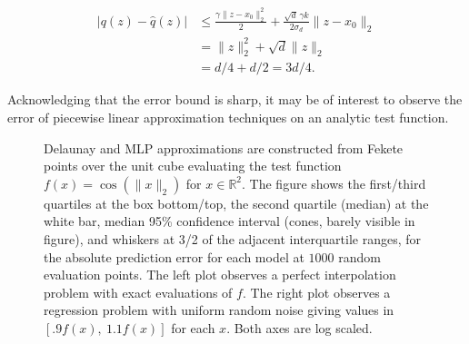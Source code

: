 \vspace{-2mm}
\begin{align*}
  \big|q(z) - \hat q(z)\big|
  &\leq \frac{\gamma \|z - x_0\|_2^2}{2} + \frac{\sqrt{d}\,\gamma k}
      {2 \sigma_d} \|z - x_0\|_2 \\
  &{}=  \|z\|_2^2 + \sqrt{d} \|z\|_2 \\
  &{}=  d/4 + d/2 = 3d/4.
\end{align*}
\vspace{-2mm}

\noindent Acknowledging that the error bound is sharp, it may be of
interest to observe the error of piecewise linear approximation
techniques on an analytic test function.

\begin{figure}
  \centering
  \caption{Delaunay and MLP approximations are constructed from Fekete
    points over the unit cube evaluating the test function $f(x) =
    \cos(\|x\|_2)$ for $x \in \mathbb{R}^2$. The figure shows the
    first/third quartiles at the box bottom/top, the second quartile
    (median) at the white bar, median 95\% confidence interval (cones,
    barely visible in figure), and whiskers at 3/2 of the adjacent
    interquartile ranges, for the absolute prediction error for each
    model at $1000$ random evaluation points. The left plot observes a
    perfect interpolation problem with exact evaluations of $f.$ The
    right plot observes a regression problem with uniform random noise
    giving values in $[.9 f(x),\ 1.1f(x)]$ for each $x.$ Both axes are
    log scaled.}
  \label{fig:convergence-2d}
\end{figure}

